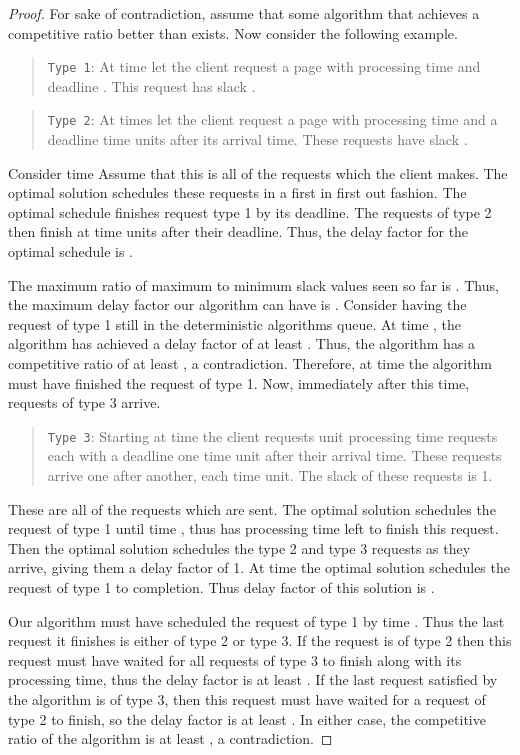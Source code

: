\documentclass[11pt]{article}
\begin{document}
\begin{proof}
For sake of contradiction, assume that some algorithm that
achieves a competitive ratio better than   exists. Now consider the following example.

\begin{quotation}
\noindent \texttt{Type 1}:  At time  let the client request a
page with processing time and deadline .  This request
has slack .
\end{quotation}

\begin{quotation}
\noindent \texttt{Type 2}:  At times 
let the client request a page with processing time 
and a deadline  time units after its arrival time.
These requests have slack . \noindent
\end{quotation}


Consider time   Assume that this is all of the
requests which the client makes.  The optimal solution schedules
these requests in a first in first out fashion.  The optimal
schedule finishes request type 1 by its deadline.  The requests of
type 2 then finish at  time units after their
deadline. Thus, the delay factor for the optimal schedule is
.

The maximum ratio of maximum to minimum slack values seen so far
is .  Thus, the maximum
delay factor our algorithm can have is . Consider having the request of type 1 still in
the deterministic algorithms queue.  At time , the
algorithm has achieved a delay factor of at least .  Thus, the algorithm has a
competitive ratio of at least , a
contradiction. Therefore, at time  the algorithm
must have finished the request of type 1.  Now, immediately after
this time, requests of type 3 arrive.

\begin{quotation}
\noindent \texttt{Type 3}: Starting at time  the
client requests  unit processing time
requests each with a deadline one time unit after their arrival
time. These requests arrive one after another, each time unit. The
slack of these requests is 1.
\end{quotation}

These are all of the requests which are sent.  The optimal
solution schedules the request of type 1 until time ,
thus has  processing time left to finish this
request. Then the optimal solution schedules the type 2 and type 3
requests as they arrive, giving them a delay factor of 1.  At time
 the optimal solution
schedules the request of type 1 to completion.  Thus delay factor
of this solution is .

Our algorithm must have scheduled the request of type 1 by time
.  Thus the last request it finishes is either of
type 2 or type 3.  If the request is of type 2 then this request
must have waited for all requests of type 3 to finish along with
its processing time, thus the delay factor is at least
.  If the last request satisfied by the algorithm is
of type 3, then this request must have waited for a request of
type 2 to finish, so the delay factor is at least .
In either case, the competitive ratio of the algorithm is at least
, a contradiction.

\end{proof}
\end{document}

